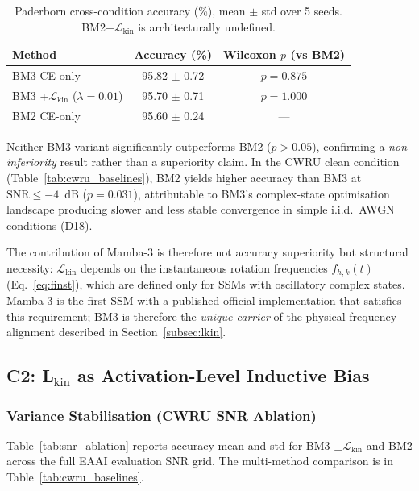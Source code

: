 \begin{table}[htbp]
\centering
\caption{Paderborn cross-condition accuracy (\%),
         mean $\pm$ std over 5 seeds.
         BM2+$\mathcal{L}_{\text{kin}}$ is architecturally undefined.}
\label{tab:c1_pu}
\begin{tabular}{lcc}
\toprule
Method & Accuracy (\%) & Wilcoxon $p$ (vs BM2) \\
\midrule
BM3 CE-only   & 95.82 $\pm$ 0.72 & $p = 0.875$ \\
BM3 +$\mathcal{L}_{\text{kin}}$ ($\lambda=0.01$) & 95.70 $\pm$ 0.71 & $p = 1.000$ \\
BM2 CE-only   & 95.60 $\pm$ 0.24 & --- \\
\bottomrule
\end{tabular}
\end{table}

Neither BM3 variant significantly outperforms BM2 ($p > 0.05$), confirming a
\emph{non-inferiority} result rather than a superiority claim.
In the CWRU clean condition (Table~\ref{tab:cwru_baselines}), BM2 yields
higher accuracy than BM3 at $\text{SNR} \leq -4$~dB ($p = 0.031$),
attributable to BM3's complex-state optimisation landscape producing slower
and less stable convergence in simple i.i.d.\ AWGN conditions (D18).

The contribution of Mamba-3 is therefore not accuracy superiority but
structural necessity: $\mathcal{L}_{\text{kin}}$ depends on the instantaneous
rotation frequencies $f_{h,k}(t)$ (Eq.~\ref{eq:finst}), which are defined
only for SSMs with oscillatory complex states.
Mamba-3 is the first SSM with a published official implementation that
satisfies this requirement; BM3 is therefore the \emph{unique carrier} of
the physical frequency alignment described in Section~\ref{subsec:lkin}.



\subsection{C2: L\texorpdfstring{$_{\text{kin}}$}{kin} as Activation-Level Inductive Bias}
\label{subsec:c2}

\subsubsection{Variance Stabilisation (CWRU SNR Ablation)}
\label{subsubsec:snr_ablation}

Table~\ref{tab:snr_ablation} reports accuracy mean and std for BM3
$\pm\mathcal{L}_{\text{kin}}$ and BM2 across the full EAAI evaluation SNR grid.
The multi-method comparison is in Table~\ref{tab:cwru_baselines}.

